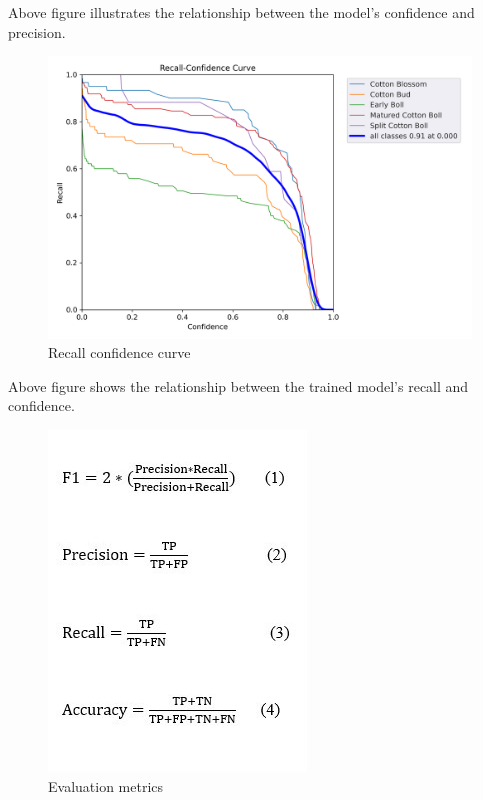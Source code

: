 \documentclass[12pt,a4paper]{report}
\begin{document}
\begin{enumerate}
\par Above figure  illustrates the relationship between the model's confidence and precision.

\begin{figure}[!htb]
\begin{center}
\includegraphics[scale=0.6]{images/results/R_curve.png}
\caption{Recall confidence curve}
\end{center}
\end{figure}

\par Above figure shows the relationship between the trained model's recall and confidence.


\begin{figure}[!htb]
\begin{center}
\includegraphics[scale=0.9]{images/results/evaluation metrics.jpg}
\caption{Evaluation metrics}
\end{center}
\end{figure}



\end{enumerate}
\end{document}
